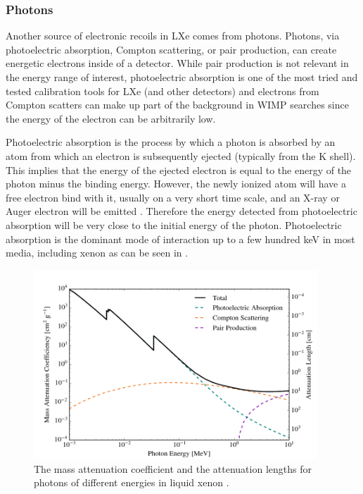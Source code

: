 \subsubsection{Photons}

Another source of electronic recoils in LXe comes from photons.  Photons, via photoelectric absorption, Compton scattering, or pair production, can create energetic electrons inside of a detector.  While pair production is not relevant in the energy range of interest, photoelectric absorption is one of the most tried and tested calibration tools for LXe (and other detectors) and electrons from Compton scatters can make up part of the background in WIMP searches since the energy of the electron can be arbitrarily low.

Photoelectric absorption is the process by which a photon is absorbed by an atom from which an electron is subsequently ejected (typically from the K shell).  This implies that the energy of the ejected electron is equal to the energy of the photon minus the binding energy.  However, the newly ionized atom will have a free electron bind with it, usually on a very short time scale, and an X-ray or Auger electron will be emitted \cite{knoll2010radiation}.  Therefore the energy detected from photoelectric absorption will be very close to the initial energy of the photon.  Photoelectric absorption is the dominant mode of interaction up to a few hundred keV in most media, including xenon as can be seen in .  

\begin{figure}[t]
	\centering
	\includegraphics[width=0.95\textwidth]{photon_attenuation}
	\caption{The mass attenuation coefficient and the attenuation lengths for photons of different energies in liquid xenon \cite{berger8coll}.}
	\label{fig:photon_attenuation}
\end{figure}

